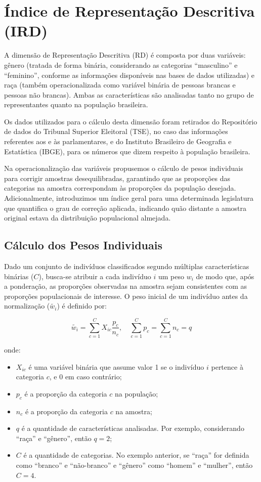 \section{Índice de Representação Descritiva (IRD)}
A dimensão de Representação Descritiva (RD) é composta por duas variáveis: gênero (tratada de forma binária, considerando as categorias ``masculino'' e ``feminino'', conforme as informações disponíveis nas bases de dados utilizadas) e raça (também operacionalizada como variável binária de pessoas brancas e pessoas não brancas). Ambas as características são analisadas tanto no grupo de representantes quanto na população brasileira.

Os dados utilizados para o cálculo desta dimensão foram retirados do Repositório de dados do Tribunal Superior Eleitoral (TSE), no caso das informações referentes aos e às parlamentares, e do Instituto Brasileiro de Geografia e Estatística (IBGE), para os números que dizem respeito à população brasileira.

Na operacionalização das variáveis propusemos o cálculo de pesos individuais para corrigir amostras desequilibradas, garantindo que as proporções das categorias na amostra correspondam às proporções da população desejada. Adicionalmente, introduzimos um índice geral para uma determinada legislatura que quantifica o grau de correção aplicada, indicando quão distante a amostra original estava da distribuição populacional almejada.

\subsection*{Cálculo dos Pesos Individuais}
Dado um conjunto de indivíduos classificados segundo múltiplas características binárias ($C$), busca-se atribuir a cada indivíduo $i$ um peso $w_i$ de modo que, após a ponderação, as proporções observadas na amostra sejam consistentes com as proporções populacionais de interesse. O peso inicial de um indivíduo antes da normalização ($\widetilde{w_i}$) é definido por:

\begin{equation}
\widetilde{w_i} = \sum_{c=1}^{C} X_{ic}\frac{p_c}{n_c}, \quad \sum_{c=1}^{C} p_c = \sum_{c=1}^{C} n_c = q
\end{equation}

onde:
\begin{itemize}
    \item $X_{ic}$ é uma variável binária que assume valor 1 se o indivíduo $i$ pertence à categoria $c$, e 0 em caso contrário;
    \item $p_c$ é a proporção da categoria $c$ na população;
    \item $n_c$ é a proporção da categoria $c$ na amostra;
    \item $q$ é a quantidade de características analisadas. Por exemplo, considerando ``raça'' e ``gênero'', então $q = 2$;
    \item $C$ é a quantidade de categorias. No exemplo anterior, se ``raça'' for definida como ``branco'' e ``não-branco'' e ``gênero'' como ``homem'' e ``mulher'', então $C = 4$.
\end{itemize}

